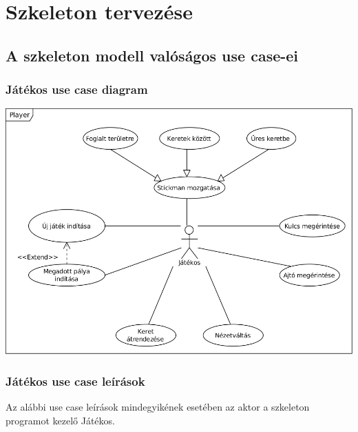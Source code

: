 

\usepackage{enumitem}



\fedlap

\addtocounter{section}{4}
\section{Szkeleton tervezése}

	\subsection{A szkeleton modell valóságos use case-ei}
        \newcommand{\ucitem}[1]{\item \textbf{Use case neve: } #1\\}
        \newcommand{\ucdesc}[1]{\textbf{Leírás: } #1\\}
        \newcommand{\ucscenario}[1]{\textbf{Forgatókönyv: }#1\\}
        
		\subsubsection{Játékos use case diagram}
		    \begin{center}
			    \includegraphics[scale=0.9]{resources/Player.png}
		    \end{center}
		
		\subsubsection{Játékos use case leírások}
		    Az alábbi use case leírások mindegyikének esetében az aktor a szkeleton programot kezelő Játékos.
		    
